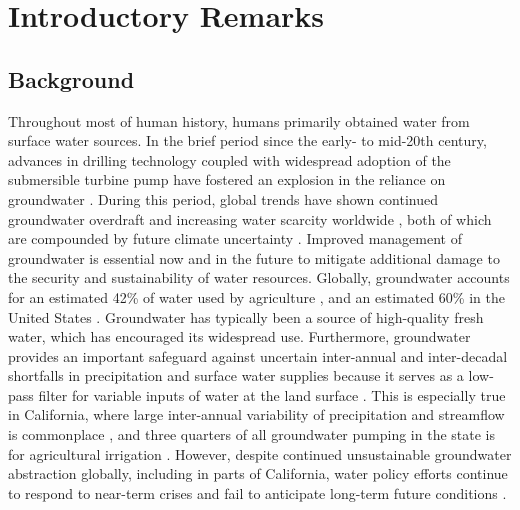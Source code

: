 \chapter[Introductory Remarks.]{Introductory Remarks}

\section{Background}

Throughout most of human history, humans primarily obtained water from surface water sources. In the brief period since the early- to mid-20th century, advances in drilling technology coupled with widespread adoption of the submersible turbine pump have fostered an explosion in the reliance on groundwater \citep{alley2002flow}. During this period, global trends have shown continued groundwater overdraft and increasing water scarcity worldwide \citep{taylor2013ground,konikow2013groundwater,wada2013human,wada2014global}, both of which are compounded by future climate uncertainty \citep{milly2008stationarity}. Improved management of groundwater is essential now and in the future to mitigate additional damage to the security and sustainability of water resources. Globally, groundwater accounts for an estimated 42\% of water used by agriculture \citep{doll2012impact}, and an estimated 60\% in the United States \citep{scanlon2012groundwater}. Groundwater has typically been a source of high-quality fresh water, which has encouraged its widespread use. Furthermore, groundwater provides an important safeguard against uncertain inter-annual and inter-decadal shortfalls in precipitation and surface water supplies \citep{hanson2012method} because it serves as a low-pass filter for variable inputs of water at the land surface \citep{niswonger2010assessing,bredehoeft2011monitoring,condon2014feedbacks}. This is especially true in California, where large inter-annual variability of precipitation and streamflow is commonplace \citep{dettinger2011atmospheric}, and three quarters of all groundwater pumping in the state is for agricultural irrigation \citep{faunt2009groundwater}. However, despite continued unsustainable groundwater abstraction globally, including in parts of California, water policy efforts continue to respond to near-term crises and fail to anticipate long-term future conditions \citep{karl2009global}.

